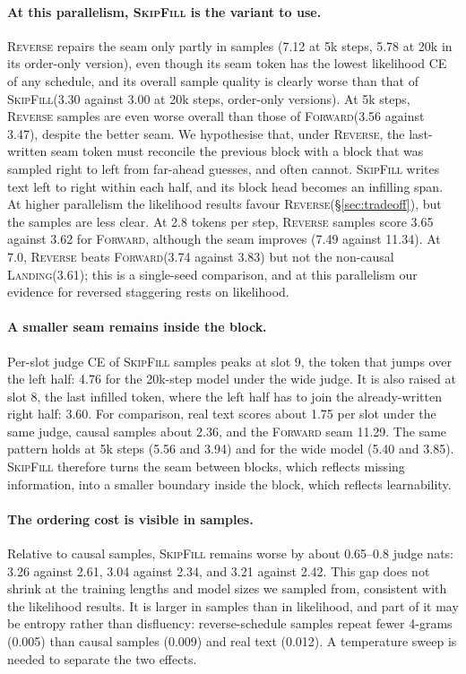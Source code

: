 \documentclass{article}
\theoremstyle{definition}
\theoremstyle{remark}
\newcommand{\name}[1]{\textup{\textsc{#1}}}
\newcommand{\sfill}{\name{SkipFill}\xspace}
\newcommand{\rev}{\name{Reverse}\xspace}
\newcommand{\fwd}{\name{Forward}\xspace}
\newcommand{\landing}{\name{Landing}\xspace}
\begin{document}
\paragraph{At this parallelism, \sfill is the variant to use.}
\rev repairs the seam only partly in samples (7.12 at 5k steps, 5.78 at 20k in its order-only version), even though its seam token has the lowest likelihood CE of any schedule, and its overall sample quality is clearly worse than that of \sfill (3.30 against 3.00 at 20k steps, order-only versions).
At 5k steps, \rev samples are even worse overall than those of \fwd (3.56 against 3.47), despite the better seam.
We hypothesise that, under \rev, the last-written seam token must reconcile the previous block with a block that was sampled right to left from far-ahead guesses, and often cannot.
\sfill writes text left to right within each half, and its block head becomes an infilling span.
At higher parallelism the likelihood results favour \rev (\S\ref{sec:tradeoff}), but the samples are less clear.
At 2.8 tokens per step, \rev samples score 3.65 against 3.62 for \fwd, although the seam improves (7.49 against 11.34).
At 7.0, \rev beats \fwd (3.74 against 3.83) but not the non-causal \landing (3.61); this is a single-seed comparison, and at this parallelism our evidence for reversed staggering rests on likelihood.

\paragraph{A smaller seam remains inside the block.}
Per-slot judge CE of \sfill samples peaks at slot 9, the token that jumps over the left half: 4.76 for the 20k-step model under the wide judge.
It is also raised at slot 8, the last infilled token, where the left half has to join the already-written right half: 3.60.
For comparison, real text scores about 1.75 per slot under the same judge, causal samples about 2.36, and the \fwd seam 11.29.
The same pattern holds at 5k steps (5.56 and 3.94) and for the wide model (5.40 and 3.85).
\sfill therefore turns the seam between blocks, which reflects missing information, into a smaller boundary inside the block, which reflects learnability.

\paragraph{The ordering cost is visible in samples.}
Relative to causal samples, \sfill remains worse by about 0.65--0.8 judge nats: 3.26 against 2.61, 3.04 against 2.34, and 3.21 against 2.42.
This gap does not shrink at the training lengths and model sizes we sampled from, consistent with the likelihood results.
It is larger in samples than in likelihood, and part of it may be entropy rather than disfluency: reverse-schedule samples repeat fewer 4-grams (0.005) than causal samples (0.009) and real text (0.012).
A temperature sweep is needed to separate the two effects.
\end{document}
